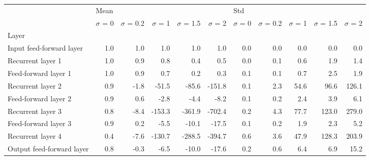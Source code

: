 \begin{tabular}{lrrrrrrrrrr}
\toprule
{} & \multicolumn{5}{l}{Mean} & \multicolumn{5}{l}{Std} \\
{} & $\sigma$  = 0 & $\sigma$  = 0.2 & $\sigma$  = 1 & $\sigma$  = 1.5 & $\sigma$  = 2 & $\sigma$  = 0 & $\sigma$  = 0.2 & $\sigma$  = 1 & $\sigma$  = 1.5 & $\sigma$  = 2 \\
Layer                     &               &                 &               &                 &               &               &                 &               &                 &               \\
\midrule
Input feed-forward layer  &           1.0 &             1.0 &           1.0 &             1.0 &           1.0 &           0.0 &             0.0 &           0.0 &             0.0 &           0.0 \\
Recurrent layer 1         &           1.0 &             0.9 &           0.8 &             0.4 &           0.5 &           0.0 &             0.1 &           0.6 &             1.9 &           1.4 \\
Feed-forward layer 1      &           1.0 &             0.9 &           0.7 &             0.2 &           0.3 &           0.1 &             0.1 &           0.7 &             2.5 &           1.9 \\
Recurrent layer 2         &           0.9 &            -1.8 &         -51.5 &           -85.6 &        -151.8 &           0.1 &             2.3 &          54.6 &            96.6 &         126.1 \\
Feed-forward layer 2      &           0.9 &             0.6 &          -2.8 &            -4.4 &          -8.2 &           0.1 &             0.2 &           2.4 &             3.9 &           6.1 \\
Recurrent layer 3         &           0.8 &            -8.4 &        -153.3 &          -361.9 &        -702.4 &           0.2 &             4.3 &          77.7 &           123.0 &         279.0 \\
Feed-forward layer 3      &           0.9 &             0.2 &          -5.5 &           -10.1 &         -17.5 &           0.1 &             0.2 &           1.9 &             2.3 &           5.2 \\
Recurrent layer 4         &           0.4 &            -7.6 &        -130.7 &          -288.5 &        -394.7 &           0.6 &             3.6 &          47.9 &           128.3 &         203.9 \\
Output feed-forward layer &           0.8 &            -0.3 &          -6.5 &           -10.0 &         -17.6 &           0.2 &             0.6 &           6.4 &             6.9 &          15.2 \\
\bottomrule
\end{tabular}
